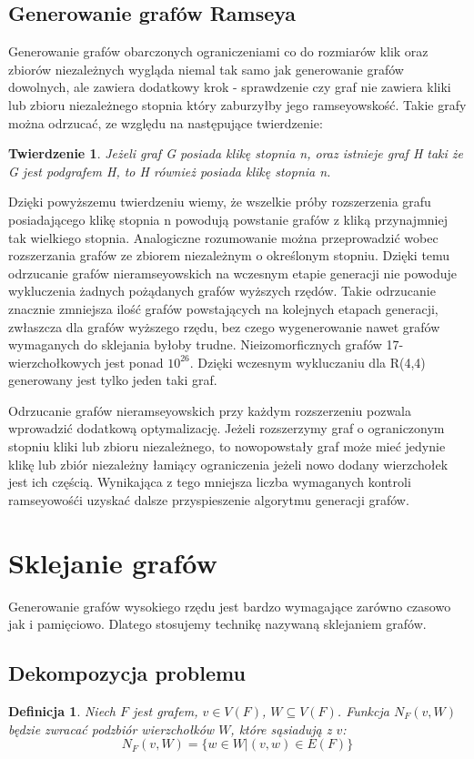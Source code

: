 \documentclass[11pt]{article}
\newtheorem{theorem}{Twierdzenie}
\newtheorem{definition}{Definicja}[section]
\begin{document}
   \subsection{Generowanie grafów Ramseya}
   Generowanie grafów obarczonych ograniczeniami co do rozmiarów klik oraz zbiorów niezależnych wygląda niemal tak samo jak generowanie grafów dowolnych, 
   ale zawiera dodatkowy krok - sprawdzenie czy graf nie zawiera kliki lub zbioru niezależnego stopnia który zaburzyłby jego ramseyowskość. Takie grafy można odrzucać, ze względu na następujące twierdzenie:
     \begin{theorem}
      Jeżeli graf G posiada klikę stopnia n, oraz istnieje graf H taki że G jest podgrafem H, to H również posiada klikę stopnia n.
   \end{theorem}
  Dzięki powyższemu twierdzeniu wiemy, że wszelkie próby rozszerzenia grafu posiadającego klikę stopnia n powodują powstanie grafów z kliką przynajmniej tak wielkiego stopnia. Analogiczne rozumowanie można przeprowadzić wobec rozszerzania grafów ze zbiorem niezależnym o określonym stopniu. Dzięki temu odrzucanie grafów nieramseyowskich na wczesnym etapie generacji nie powoduje wykluczenia żadnych pożądanych grafów wyższych rzędów. Takie odrzucanie znacznie zmniejsza ilość grafów powstających na kolejnych etapach generacji, zwłaszcza dla grafów wyższego rzędu, bez czego wygenerowanie nawet grafów wymaganych do sklejania byłoby trudne. Nieizomorficznych grafów 17-wierzchołkowych jest ponad $10^{26}$\cite{OEIS}. Dzięki wczesnym wykluczaniu dla R(4,4) generowany jest tylko jeden taki graf. 
  
Odrzucanie grafów nieramseyowskich przy każdym rozszerzeniu pozwala wprowadzić dodatkową optymalizację. Jeżeli rozszerzymy graf o ograniczonym stopniu kliki lub zbioru niezależnego, to nowopowstały graf może mieć jedynie klikę lub zbiór niezależny łamiący ograniczenia jeżeli nowo dodany wierzchołek jest ich częścią. Wynikająca z tego mniejsza liczba wymaganych kontroli ramseyowośći uzyskać dalsze przyspieszenie algorytmu generacji grafów.


\section{Sklejanie grafów}
Generowanie grafów wysokiego rzędu jest bardzo wymagające zarówno czasowo jak i pamięciowo. Dlatego stosujemy technikę nazywaną sklejaniem grafów. 

\subsection{Dekompozycja problemu}
\begin{definition}
  Niech $F$ jest grafem, $v \in V(F)$, $W \subseteq V(F)$. 
  Funkcja $N_F(v,W)$ będzie zwracać podzbiór wierzchołków $W$, które sąsiadują z $v$: 
  $$N_F(v,W) = \{w \in W | (v,w) \in E(F)\}$$ 
\end{definition}
\end{document}
